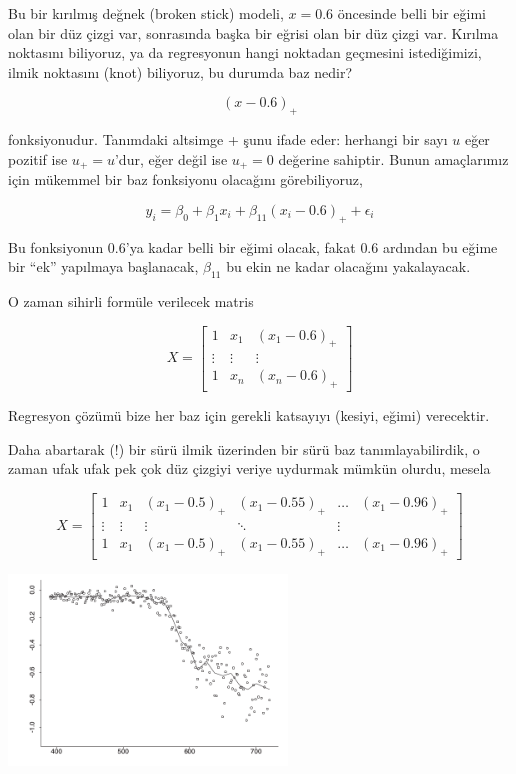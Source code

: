 \documentclass[12pt,fleqn]{article}\usepackage{../../common}
\begin{document}
Bu bir kırılmış değnek (broken stick) modeli, $x=0.6$ öncesinde belli bir
eğimi olan bir düz çizgi var, sonrasında başka bir eğrisi olan bir düz
çizgi var. Kırılma noktasını biliyoruz, ya da regresyonun hangi noktadan
geçmesini istediğimizi, ilmik noktasını (knot) biliyoruz, bu durumda baz
nedir? 

$$ (x-0.6)_+$$ 

fonksiyonudur. Tanımdaki altsimge + şunu ifade eder: herhangi bir sayı $u$
eğer pozitif ise $u_+ = u$'dur, eğer değil ise $u_+ = 0$ değerine
sahiptir. Bunun amaçlarımız için mükemmel bir baz fonksiyonu olacağını
görebiliyoruz, 

$$y_i = \beta_0 + \beta_1x_i + \beta_{11}(x_i-0.6)_+ + \epsilon_i $$

Bu fonksiyonun $0.6$'ya kadar belli bir eğimi olacak, fakat $0.6$ ardından
bu eğime bir ``ek'' yapılmaya başlanacak, $\beta_{11}$ bu ekin ne kadar
olacağını yakalayacak. 

O zaman sihirli formüle verilecek matris

$$ 
X = 
\left[\begin{array}{ccc}
1 & x_1 & (x_1 - 0.6)_+ \\ 
\vdots & \vdots & \vdots \\
1 & x_n & (x_n - 0.6)_+
\end{array}\right]
$$

Regresyon çözümü bize her baz için gerekli katsayıyı (kesiyi, eğimi)
verecektir. 

Daha abartarak (!) bir sürü ilmik üzerinden bir sürü baz tanımlayabilirdik,
o zaman ufak ufak pek çok düz çizgiyi veriye uydurmak mümkün olurdu, mesela

$$ X = 
\left[\begin{array}{cccccc}
1 & x_1 & (x_1 - 0.5)_+ & (x_1 - 0.55)_+ & \dots & (x_1 - 0.96)_+\\ 
\vdots & \vdots & \vdots & \ddots & \vdots \\
1 & x_1 & (x_1 - 0.5)_+ & (x_1 - 0.55)_+ & \dots & (x_1 - 0.96)_+
\end{array}\right]
$$

\includegraphics[width=20em]{compscieng_app20_05.png}
\end{document}
